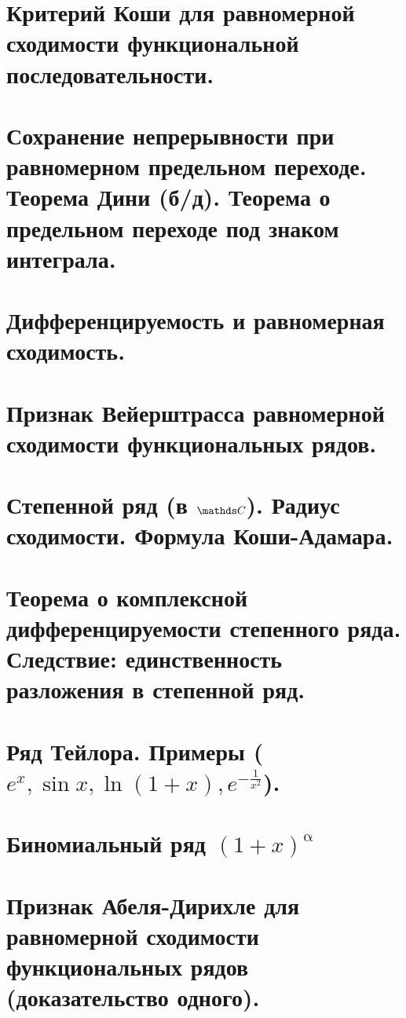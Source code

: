 \documentclass[12pt, fleqn]{article}
\begin{document}
\begin{Property}[3]
\begin{Property}[4]
\begin{Property}[2, аддитивность]
\begin{Proof}
\newpage
\section{Критерий Коши для равномерной сходимости функциональной последовательности.}


\newpage
\section{Сохранение непрерывности при равномерном предельном переходе. Теорема Дини (б/д). Теорема о предельном переходе под знаком интеграла.}


\newpage
\section{Дифференцируемость и равномерная сходимость.}


\newpage
\section{Признак Вейерштрасса равномерной сходимости функциональных рядов.}


\newpage
\section{Степенной ряд (в $\CC$). Радиус сходимости. Формула Коши-Адамара.}


\newpage
\section{Теорема о комплексной дифференцируемости степенного ряда. Следствие: единственность разложения в степенной ряд.}


\newpage
\section{Ряд Тейлора. Примеры ($e^x,\sin x,\ln(1 + x), e^{-\frac{1}{x^2}}$).}


\newpage
\section{Биномиальный ряд $(1 + x)^\upalpha$}


\newpage
\section{Признак Абеля-Дирихле для равномерной сходимости функциональных рядов (доказательство одного).}



\end{Proof}
\end{Property}
\end{Property}
\end{Property}
\end{document}
